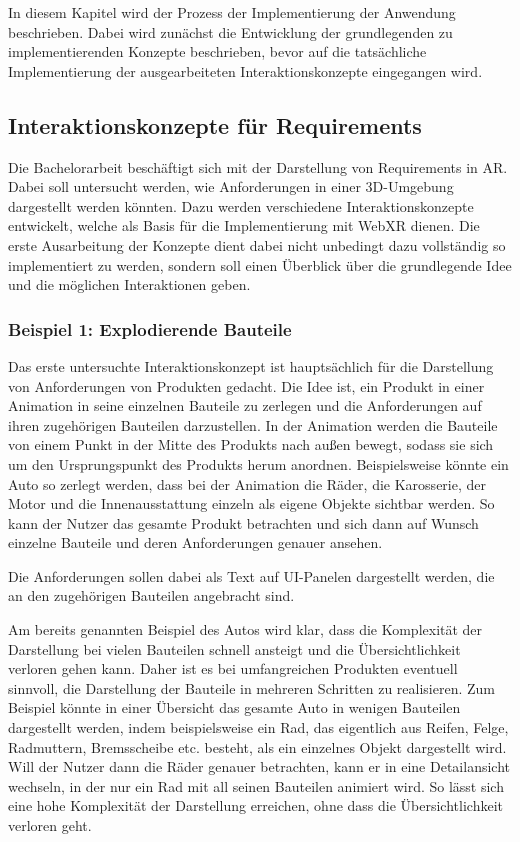 In diesem Kapitel wird der Prozess der Implementierung der Anwendung beschrieben.
Dabei wird zunächst die Entwicklung der grundlegenden zu implementierenden Konzepte beschrieben, bevor auf die tatsächliche Implementierung der ausgearbeiteten Interaktionskonzepte eingegangen wird.

\subsection{Interaktionskonzepte für Requirements}

Die Bachelorarbeit beschäftigt sich mit der Darstellung von Requirements in AR.
Dabei soll untersucht werden, wie Anforderungen in einer 3D-Umgebung dargestellt werden könnten.
Dazu werden verschiedene Interaktionskonzepte entwickelt, welche als Basis für die Implementierung mit WebXR dienen.
Die erste Ausarbeitung der Konzepte dient dabei nicht unbedingt dazu vollständig so implementiert zu werden, sondern soll einen Überblick über die grundlegende Idee und die möglichen Interaktionen geben.



\subsubsection{Beispiel 1: Explodierende Bauteile}

Das erste untersuchte Interaktionskonzept ist hauptsächlich für die Darstellung von Anforderungen von Produkten gedacht.
Die Idee ist, ein Produkt in einer Animation in seine einzelnen Bauteile zu zerlegen und die Anforderungen auf ihren zugehörigen Bauteilen darzustellen.
In der Animation werden die Bauteile von einem Punkt in der Mitte des Produkts nach außen bewegt, sodass sie sich um den Ursprungspunkt des Produkts herum anordnen.
Beispielsweise könnte ein Auto so zerlegt werden, dass bei der Animation die Räder, die Karosserie, der Motor und die Innenausstattung einzeln als eigene Objekte sichtbar werden.
So kann der Nutzer das gesamte Produkt betrachten und sich dann auf Wunsch einzelne Bauteile und deren Anforderungen genauer ansehen.

Die Anforderungen sollen dabei als Text auf UI-Panelen dargestellt werden, die an den zugehörigen Bauteilen angebracht sind.

Am bereits genannten Beispiel des Autos wird klar, dass die Komplexität der Darstellung bei vielen Bauteilen schnell ansteigt und die Übersichtlichkeit verloren gehen kann.
Daher ist es bei umfangreichen Produkten eventuell sinnvoll, die Darstellung der Bauteile in mehreren Schritten zu realisieren.
Zum Beispiel könnte in einer Übersicht das gesamte Auto in wenigen Bauteilen dargestellt werden, indem beispielsweise ein Rad, das eigentlich aus Reifen, Felge, Radmuttern, Bremsscheibe etc. besteht, als ein einzelnes Objekt dargestellt wird.
Will der Nutzer dann die Räder genauer betrachten, kann er in eine Detailansicht wechseln, in der nur ein Rad mit all seinen Bauteilen animiert wird.
So lässt sich eine hohe Komplexität der Darstellung erreichen, ohne dass die Übersichtlichkeit verloren geht.


